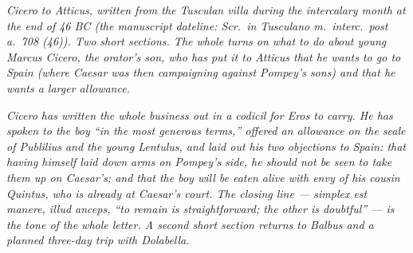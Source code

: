 
\textit{Cicero to Atticus, written from the Tusculan
villa during the intercalary month at the end of 46 BC
(the manuscript dateline: \textit{Scr.\ in Tusculano
m.\ interc.\ post a.\ 708 (46)}). Two short sections.
The whole turns on what to do about young Marcus
Cicero, the orator's son, who has put it to Atticus
that he wants to go to Spain (where Caesar was then
campaigning against Pompey's sons) and that he wants a
larger allowance.}

\textit{Cicero has written the whole business out in a
codicil for Eros to carry. He has spoken to the boy
``in the most generous terms,'' offered an allowance
on the scale of Publilius and the young Lentulus, and
laid out his two objections to Spain: that having
himself laid down arms on Pompey's side, he should not
be seen to take them up on Caesar's; and that the boy
will be eaten alive with envy of his cousin Quintus,
who is already at Caesar's court. The closing line ---
\textit{simplex est manere, illud anceps}, ``to remain
is straightforward; the other is doubtful'' --- is the
tone of the whole letter. A second short section
returns to Balbus and a planned three-day trip with
Dolabella.}
